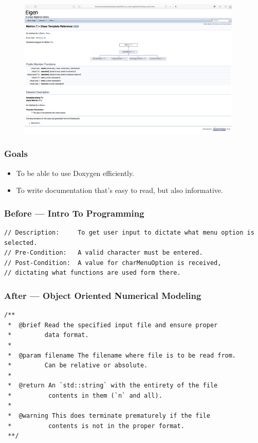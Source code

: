 \documentclass[xclolor=dvipsnames]{beamer}            %
\begin{document}
\begin{darkframes}
\begin{frame}
        \begin{figure}[H]
            \centering
            \includegraphics[width=0.95\textwidth]{assets/doxygen.png}
            \label{fig:doxygen}
        \end{figure}

    \end{frame}

    \begin{frame}
        \frametitle{Goals}

        \begin{itemize}
            \item To be able to use Doxygen efficiently.
            \item To write documentation that's easy to read, but also informative.
        \end{itemize}
    \end{frame}

    \begin{frame}[fragile]
        \frametitle{Before --- Intro To Programming}
        \begin{lstlisting}
// Description:     To get user input to dictate what menu option is selected.
// Pre-Condition:   A valid character must be entered.
// Post-Condition:  A value for charMenuOption is received,
// dictating what functions are used form there.
        \end{lstlisting}
    \end{frame}

    \begin{frame}[fragile]
        \frametitle{After --- Object Oriented Numerical Modeling}
        \tiny
        \begin{lstlisting}
/**
 *  @brief Read the specified input file and ensure proper
 *         data format.
 *
 *  @param filename The filename where file is to be read from.
 *         Can be relative or absolute.
 *
 *  @return An `std::string` with the entirety of the file
 *          contents in them (`n` and all).
 *
 *  @warning This does terminate prematurely if the file
 *          contents is not in the proper format.
 **/
        \end{lstlisting}
    \end{frame}


\end{darkframes}
\end{document}
